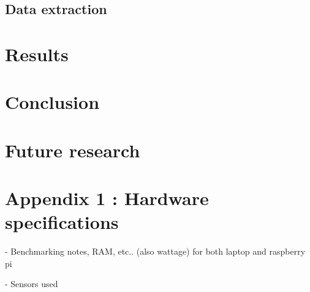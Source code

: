 \documentclass[12pt]{article}
\begin{document}
\subsection{Data extraction}

\section{Results}

\section{Conclusion}

\section{Future research}

\section{Appendix 1 : Hardware specifications}

- Benchmarking notes, RAM, etc.. (also wattage) for both laptop and raspberry pi

- Sensors used
\end{document}
